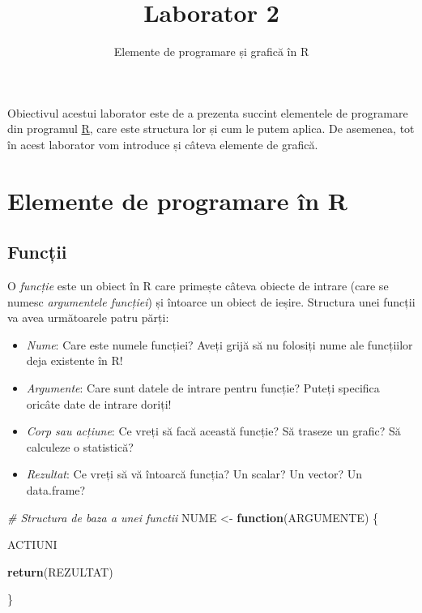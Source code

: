 \documentclass[]{article}
\title{Laborator 2}
\subtitle{Elemente de programare și grafică în R}
\author{}
\date{}
\newenvironment{Shaded}{\begin{snugshade}}{\end{snugshade}}
\newcommand{\KeywordTok}[1]{\textcolor[rgb]{0.13,0.29,0.53}{\textbf{#1}}}
\newcommand{\StringTok}[1]{\textcolor[rgb]{0.31,0.60,0.02}{#1}}
\newcommand{\CommentTok}[1]{\textcolor[rgb]{0.56,0.35,0.01}{\textit{#1}}}
\newcommand{\ControlFlowTok}[1]{\textcolor[rgb]{0.13,0.29,0.53}{\textbf{#1}}}
\newcommand{\NormalTok}[1]{#1}
\begin{document}
\maketitle

\thispagestyle{fancy}

Obiectivul acestui laborator este de a prezenta succint elementele de
programare din programul \href{https://cran.r-project.org/}{R}, care
este structura lor și cum le putem aplica. De asemenea, tot în acest
laborator vom introduce și câteva elemente de grafică.

\section{Elemente de programare în R}\label{elemente-de-programare-in-r}

\subsection{Funcții}\label{functii}

O \emph{funcție} este un obiect în R care primește câteva obiecte de
intrare (care se numesc \emph{argumentele funcției}) și întoarce un
obiect de ieșire. Structura unei funcții va avea următoarele patru
părți:

\begin{itemize}
\item
  \emph{Nume}: Care este numele funcției? Aveți grijă să nu folosiți
  nume ale funcțiilor deja existente în R!
\item
  \emph{Argumente}: Care sunt datele de intrare pentru funcție? Puteți
  specifica oricâte date de intrare doriți!
\item
  \emph{Corp sau acțiune}: Ce vreți să facă această funcție? Să traseze
  un grafic? Să calculeze o statistică?
\item
  \emph{Rezultat}: Ce vreți să vă întoarcă funcția? Un scalar? Un
  vector? Un data.frame?
\end{itemize}

\begin{Shaded}
\begin{Highlighting}[]
\CommentTok{# Structura de baza a unei functii}
\NormalTok{NUME <-}\StringTok{ }\ControlFlowTok{function}\NormalTok{(ARGUMENTE) \{}

\NormalTok{  ACTIUNI}

  \KeywordTok{return}\NormalTok{(REZULTAT)}

\NormalTok{\}}
\end{Highlighting}
\end{Shaded}
\end{document}
